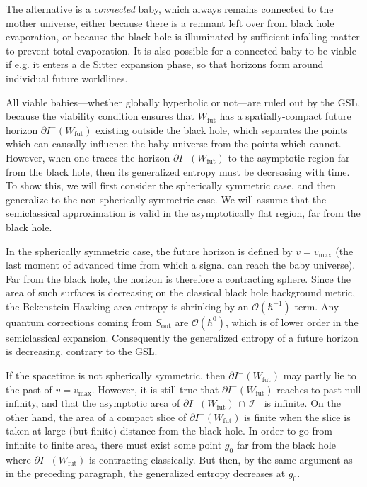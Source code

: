\documentclass[12pt]{article}
\begin{document}
The alternative is a \textit{connected} baby, which always remains connected to the mother universe, either because there is a remnant left over from black hole evaporation, or because the black hole is illuminated by sufficient infalling matter to prevent total evaporation.  It is also possible for a connected baby to be viable if e.g. it enters a de Sitter expansion phase, so that horizons form around individual future worldlines.

All viable babies---whether globally hyperbolic or not---are ruled out by the GSL, because the viability condition ensures that $W_\mathrm{fut}$ has a spatially-compact future horizon $\partial I^-(W_\mathrm{fut})$ existing outside the black hole, which separates the points which can causally influence the baby universe from the points which cannot.  However, when one traces the horizon $\partial I^-(W_\mathrm{fut})$ to the asymptotic region far from the black hole, then its generalized entropy must be decreasing with time.  To show this, we will first consider the spherically symmetric case, and then generalize to the non-spherically symmetric case.  We will assume that the semiclassical approximation is valid in the asymptotically flat region, far from the black hole.

In the spherically symmetric case, the future horizon is defined by $v = v_\mathrm{max}$ (the last moment of advanced time from which a signal can reach the baby universe).  Far from the black hole, the horizon is therefore a contracting sphere.  Since the area of such surfaces is decreasing on the classical black hole background metric, the Bekenstein-Hawking area entropy is shrinking by an $\mathcal{O}(\hbar^{-1})$ term.  Any quantum corrections coming from $S_\mathrm{out}$ are $\mathcal{O}(\hbar^{0})$, which is of lower order in the semiclassical expansion.  Consequently the generalized entropy of a future horizon is decreasing, contrary to the GSL.

If the spacetime is not spherically symmetric, then $\partial I^-(W_\mathrm{fut})$ may partly lie to the past of $v = v_\mathrm{max}$.  However, it is still true that $\partial I^-(W_\mathrm{fut})$ reaches to past null infinity, and that the asymptotic area of $\partial I^-(W_\mathrm{fut})\,\cap\,\mathcal{I}^-$ is infinite.  On the other hand, the area of a compact slice of $\partial I^-(W_\mathrm{fut})$ is finite when the slice is taken at large (but finite) distance from the black hole.  In order to go from infinite to finite area, there must exist some point $g_0$ far from the black hole where $\partial I^-(W_\mathrm{fut})$ is contracting classically.  But then, by the same argument as in the preceding paragraph, the generalized entropy decreases at $g_0$.
\end{document}
